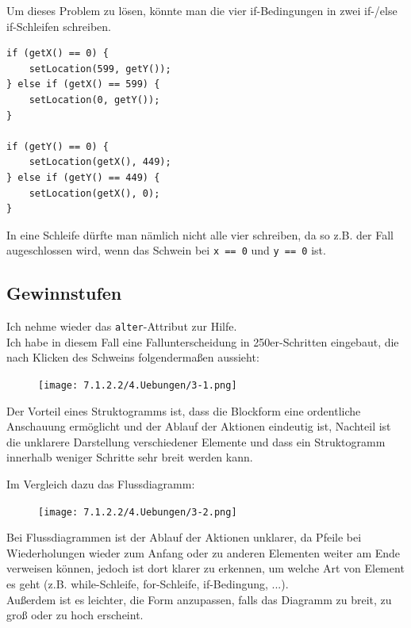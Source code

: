 \documentclass{scrartcl}   %
\begin{document}
Um dieses Problem zu lösen, könnte man die vier if-Bedingungen in zwei if-/else if-Schleifen schreiben.

\begin{lstlisting}
if (getX() == 0) {
    setLocation(599, getY());
} else if (getX() == 599) {
    setLocation(0, getY());
}

if (getY() == 0) {
    setLocation(getX(), 449);
} else if (getY() == 449) {
    setLocation(getX(), 0);
}
\end{lstlisting}

In eine Schleife dürfte man nämlich nicht alle vier schreiben, da so z.B. der Fall augeschlossen wird, wenn das Schwein bei \texttt{x == 0} und \texttt{y == 0} ist.

\newpage

\subsection{Gewinnstufen}

Ich nehme wieder das \texttt{alter}-Attribut zur Hilfe.\\
Ich habe in diesem Fall eine Fallunterscheidung in 250er-Schritten eingebaut, die nach Klicken des Schweins folgendermaßen aussieht:\\

\begin{figure}[ht]
	\centering
	\texttt{[image: 7.1.2.2/4.Uebungen/3-1.png]}
\end{figure}

Der Vorteil eines Struktogramms ist, dass die Blockform eine ordentliche Anschauung ermöglicht und der Ablauf der Aktionen eindeutig ist, Nachteil ist die unklarere Darstellung verschiedener Elemente und dass ein Struktogramm innerhalb weniger Schritte sehr breit werden kann.\\

\newpage

Im Vergleich dazu das Flussdiagramm:

\begin{figure}[ht]
	\centering
	\texttt{[image: 7.1.2.2/4.Uebungen/3-2.png]}
\end{figure}

Bei Flussdiagrammen ist der Ablauf der Aktionen unklarer, da Pfeile bei Wiederholungen wieder zum Anfang oder zu anderen Elementen weiter am Ende verweisen können, jedoch ist dort klarer zu erkennen, um welche Art von Element es geht (z.B. while-Schleife, for-Schleife, if-Bedingung, ...).\\
Außerdem ist es leichter, die Form anzupassen, falls das Diagramm zu breit, zu groß oder zu hoch erscheint.\\
\end{document}
